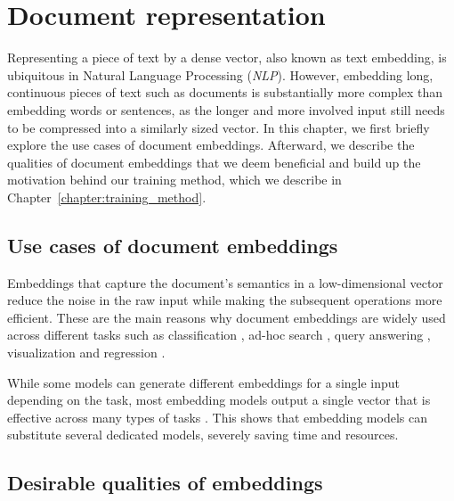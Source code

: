 \chapter{Document representation}\label{chapter:document_representation}

Representing a piece of text by a dense vector, also known as text embedding,
is ubiquitous in Natural Language Processing (\emph{NLP}). However, embedding
long, continuous pieces of text such as documents is substantially more complex
than embedding words or sentences, as the longer and more involved input still
needs to be compressed into a similarly sized vector. In this chapter, we first
briefly explore the use cases of document embeddings. Afterward, we describe
the qualities of document embeddings that we deem beneficial and build up the
motivation behind our training method, which we describe in
Chapter~\ref{chapter:training_method}.

\section{Use cases of document embeddings}

Embeddings that capture the document's semantics in a low-dimensional
vector reduce the noise in the raw input while making the subsequent operations
more efficient.
These are the main reasons why document embeddings are
widely used across different tasks such as
classification \citep{cohan2020specter, neelakantan2022text,
izacard2021unsupervised, ostendorff2022neighborhood}, ad-hoc
search \citep{singh2022scirepeval, zamani2018neural}, query
answering \citep{neelakantan2022text}, visualization \citep{cohan2020specter,
dai2015document} and regression \citep{singh2022scirepeval}.

While some models \citep{singh2022scirepeval} can generate different embeddings
for a single input depending on the task, most embedding models output a single
vector that is effective across many types of tasks \citep{neelakantan2022text,
cohan2020specter, ostendorff2022neighborhood}. This shows that embedding models
can substitute several dedicated models, severely saving time and resources.

\section{Desirable qualities of embeddings}

